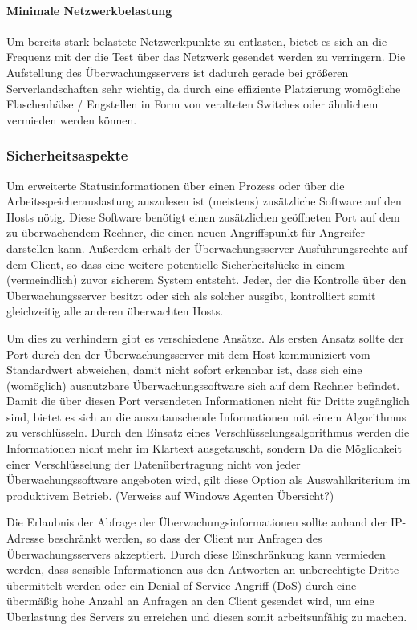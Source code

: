 \paragraph{Minimale Netzwerkbelastung}
Um bereits stark belastete Netzwerkpunkte zu entlasten, bietet es sich an die Frequenz mit der die Test über das Netzwerk gesendet werden zu verringern.
Die Aufstellung des Überwachungsservers ist dadurch gerade bei größeren Serverlandschaften sehr wichtig, da durch eine effiziente Platzierung womögliche Flaschenhälse / Engstellen in Form von veralteten Switches oder ähnlichem vermieden werden können.

\subsubsection{Sicherheitsaspekte}
Um erweiterte Statusinformationen über einen Prozess oder über die Arbeitsspeicherauslastung auszulesen ist (meistens) zusätzliche Software auf den Hosts nötig.
Diese Software benötigt einen zusätzlichen geöffneten Port auf dem zu überwachendem Rechner, die einen neuen Angriffspunkt für Angreifer darstellen kann.
Außerdem erhält der Überwachungsserver Ausführungsrechte auf dem Client, so dass eine weitere potentielle Sicherheitslücke in einem (vermeindlich) zuvor sicherem System entsteht.
Jeder, der die Kontrolle über den Überwachungsserver besitzt oder sich als solcher ausgibt, kontrolliert somit gleichzeitig alle anderen überwachten Hosts.

Um dies zu verhindern gibt es verschiedene Ansätze.
Als ersten Ansatz sollte der Port durch den der Überwachungsserver mit dem Host kommuniziert vom Standardwert abweichen, damit nicht sofort erkennbar ist, dass sich eine (womöglich) ausnutzbare Überwachungssoftware sich auf dem Rechner befindet.
Damit die über diesen Port versendeten Informationen nicht für Dritte zugänglich sind, bietet es sich an die auszutauschende Informationen mit einem Algorithmus zu verschlüsseln.
Durch den Einsatz eines Verschlüsselungsalgorithmus werden die Informationen nicht mehr im Klartext ausgetauscht, sondern
Da die Möglichkeit einer Verschlüsselung der Datenübertragung nicht von jeder Überwachungssoftware angeboten wird, gilt diese Option als Auswahlkriterium im produktivem Betrieb. (Verweiss auf Windows Agenten Übersicht?)

Die Erlaubnis der Abfrage der Überwachungsinformationen sollte anhand der \gls{IP}-Adresse beschränkt werden, so dass der Client nur Anfragen des Überwachungsservers akzeptiert.
Durch diese Einschränkung kann vermieden werden, dass sensible Informationen aus den Antworten an unberechtigte Dritte übermittelt werden oder ein Denial of Service-Angriff (\gls{DoS}) durch eine übermäßig hohe Anzahl an Anfragen an den Client gesendet wird, um eine Überlastung des Servers zu erreichen und diesen somit arbeitsunfähig zu machen.

